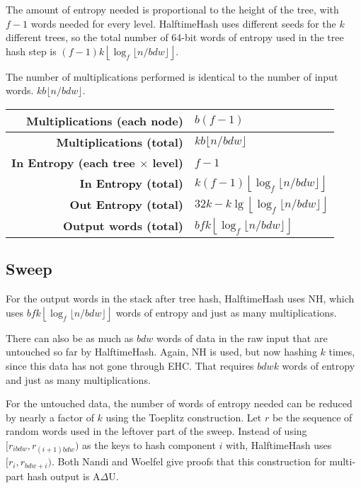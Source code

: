 \documentclass[runningheads]{llncs}
\begin{document}

The amount of entropy needed is proportional to the height of the tree, with $f - 1$ words needed for every level.
HalftimeHash uses different seeds for the $k$ different trees, so the total number of 64-bit words of entropy used in the tree hash step is $(f - 1) k\left\lfloor\log_f \lfloor n/b d w\rfloor\right\rfloor$.

The number of multiplications performed is identical to the number of input words. $k b \lfloor n / b d w \rfloor$.

\begin{tabular}{|r|l|}
    \hline {\bf Multiplications (each node)} & $b (f-1)$ \\
    \hline {\bf Multiplications (total)} & $k b \lfloor n / b d w \rfloor$ \\
    \hline {\bf In Entropy (each tree $\times$ level)} & $f-1$ \\
    \hline {\bf In Entropy (total)} & $k (f-1) \left\lfloor \log_f \lfloor n / b d w \rfloor \right\rfloor$ \\
    \hline {\bf Out Entropy (total)} & $32k - k\lg\left\lfloor\log_f \lfloor n/b d w\rfloor\right\rfloor$\\
    \hline {\bf Output words (total)} & $b f k \left\lfloor \log_f \lfloor n / b d w \rfloor \right\rfloor$\\
    \hline
\end{tabular}


\subsection{Sweep}

For the output words in the stack after tree hash, HalftimeHash uses NH, which uses $b f k \left\lfloor \log_f \lfloor n / b d w \rfloor \right\rfloor$ words of entropy and just as many multiplications.

There can also be as much as $b d w$ words of data in the raw input that are untouched so far by HalftimeHash.
Again, NH is used, but now hashing $k$ times, since this data has not gone through EHC.
That requires $b d w k$ words of entropy and just as many multiplications.

For the untouched data, the number of words of entropy needed can be reduced by nearly a factor of $k$ using the Toeplitz construction.
Let $r$ be the sequence of random words used in the leftover part of the sweep.
Instead of using $[r_{i b d w}, r_{(i+1)b d w})$ as the keys to hash component $i$ with, HalftimeHash uses $[r_{i}, r_{b d w + i})$.
Both Nandi and Woelfel give proofs that this construction for multi-part hash output is A$\Delta$U. \cite{ehc-nandi,woelfel-toeplitz}
\end{document}
